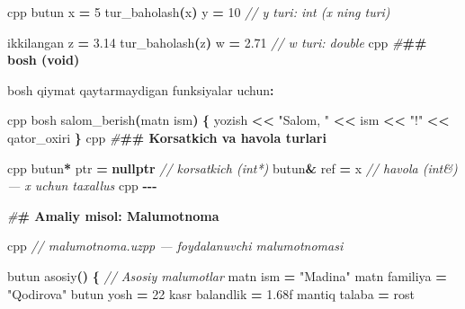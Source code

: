 \documentclass[a4paper,11pt,twoside,openright]{book}
\newenvironment{Shaded}{\begin{snugshade}}{\end{snugshade}}
\newcommand{\BuiltInTok}[1]{#1}
\newcommand{\CommentTok}[1]{\textcolor[rgb]{0.56,0.35,0.01}{\textit{#1}}}
\newcommand{\DecValTok}[1]{\textcolor[rgb]{0.00,0.00,0.81}{#1}}
\newcommand{\ErrorTok}[1]{\textcolor[rgb]{0.64,0.00,0.00}{\textbf{#1}}}
\newcommand{\FloatTok}[1]{\textcolor[rgb]{0.00,0.00,0.81}{#1}}
\newcommand{\KeywordTok}[1]{\textcolor[rgb]{0.13,0.29,0.53}{\textbf{#1}}}
\newcommand{\NormalTok}[1]{#1}
\newcommand{\OperatorTok}[1]{\textcolor[rgb]{0.81,0.36,0.00}{\textbf{#1}}}
\newcommand{\PreprocessorTok}[1]{\textcolor[rgb]{0.56,0.35,0.01}{\textit{#1}}}
\newcommand{\StringTok}[1]{\textcolor[rgb]{0.31,0.60,0.02}{#1}}
\begin{document}
\begin{Shaded}
\begin{Highlighting}[]
\ErrorTok{\textasciigrave{}\textasciigrave{}\textasciigrave{}}\NormalTok{cpp}
\NormalTok{butun x }\OperatorTok{=} \DecValTok{5}
\NormalTok{tur\_baholash}\OperatorTok{(}\NormalTok{x}\OperatorTok{)}\NormalTok{ y }\OperatorTok{=} \DecValTok{10}    \CommentTok{// y turi: int (x ning turi)}

\NormalTok{ikkilangan z }\OperatorTok{=} \FloatTok{3.14}
\NormalTok{tur\_baholash}\OperatorTok{(}\NormalTok{z}\OperatorTok{)}\NormalTok{ w }\OperatorTok{=} \FloatTok{2.71}  \CommentTok{// w turi: double}
\ErrorTok{\textasciigrave{}\textasciigrave{}\textasciigrave{}}\NormalTok{cpp}
\PreprocessorTok{\#}\ErrorTok{\#\# \textasciigrave{}bosh\textasciigrave{} (void)}

\ErrorTok{\textasciigrave{}}\NormalTok{bosh}\ErrorTok{\textasciigrave{}}\NormalTok{ qiymat qaytarmaydigan funksiyalar uchun}\OperatorTok{:}

\ErrorTok{\textasciigrave{}\textasciigrave{}\textasciigrave{}}\NormalTok{cpp}
\NormalTok{bosh salom\_berish}\OperatorTok{(}\NormalTok{matn ism}\OperatorTok{)} \OperatorTok{\{}
\NormalTok{    yozish }\OperatorTok{\textless{}\textless{}} \StringTok{"Salom, "} \OperatorTok{\textless{}\textless{}}\NormalTok{ ism }\OperatorTok{\textless{}\textless{}} \StringTok{"!"} \OperatorTok{\textless{}\textless{}}\NormalTok{ qator\_oxiri}
\OperatorTok{\}}
\ErrorTok{\textasciigrave{}\textasciigrave{}\textasciigrave{}}\NormalTok{cpp}
\PreprocessorTok{\#}\ErrorTok{\#\# Ko\textquotesingle{}rsatkich va havola turlari}

\ErrorTok{\textasciigrave{}\textasciigrave{}\textasciigrave{}}\NormalTok{cpp}
\NormalTok{butun}\OperatorTok{*}\NormalTok{ ptr }\OperatorTok{=} \KeywordTok{nullptr}           \CommentTok{// ko\textquotesingle{}rsatkich (int*)}
\NormalTok{butun}\OperatorTok{\&}\NormalTok{ ref }\OperatorTok{=}\NormalTok{ x                 }\CommentTok{// havola (int\&) — x uchun taxallus}
\ErrorTok{\textasciigrave{}\textasciigrave{}\textasciigrave{}}\NormalTok{cpp}
\OperatorTok{{-}{-}{-}}

\PreprocessorTok{\#}\ErrorTok{\# Amaliy misol: Ma\textquotesingle{}lumotnoma}

\ErrorTok{\textasciigrave{}\textasciigrave{}\textasciigrave{}}\NormalTok{cpp}
\CommentTok{// malumotnoma.uzpp — foydalanuvchi ma\textquotesingle{}lumotnomasi}

\NormalTok{butun asosiy}\OperatorTok{()} \OperatorTok{\{}
    \CommentTok{// Asosiy ma\textquotesingle{}lumotlar}
\NormalTok{    matn ism }\OperatorTok{=} \StringTok{"Madina"}
\NormalTok{    matn familiya }\OperatorTok{=} \StringTok{"Qodirova"}
\NormalTok{    butun yosh }\OperatorTok{=} \DecValTok{22}
\NormalTok{    kasr balandlik }\OperatorTok{=} \FloatTok{1.68}\BuiltInTok{f}
\NormalTok{    mantiq talaba }\OperatorTok{=}\NormalTok{ rost}


\end{Highlighting}
\end{Shaded}
\end{document}
